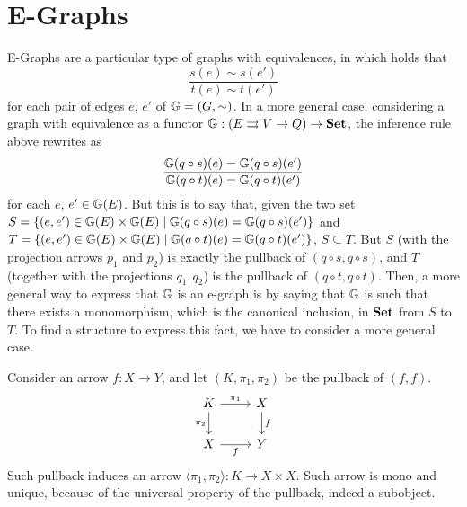 \documentclass[a4paper, twoside,openright]{report}
\theoremstyle{plain}
\theoremstyle{definition}
\begin{document}
\section{E-Graphs}\label{sect:eggs}


E-Graphs are a particular type of graphs with equivalences, in which holds that
$$
    \frac{s(e) \sim s(e')}{t(e) \sim t(e')}
$$
for each pair of edges $e$, $e'$ of $\mathbb{G} = (G, \sim)$.
In a more general case, considering a graph with equivalence as a functor $\mathbb{G} : (E \rightrightarrows V \rightarrow Q) \rightarrow \mathbf{Set}$, the inference rule above rewrites as
\[
    \frac{\mathbb{G}(q \circ s)(e) = \mathbb{G}(q \circ s)(e')}{\mathbb{G}(q \circ t)(e) = \mathbb{G}(q \circ t)(e')}
\] for each $e$, $e' \in \mathbb{G}(E)$.
But this is to say that, given the two set $S = \{ (e, e') \in \mathbb{G}(E) \times \mathbb{G}(E) \mid \mathbb{G}(q \circ s)(e) = \mathbb{G}(q \circ s)(e') \}$ and $T =\{ (e, e') \in \mathbb{G}(E) \times \mathbb{G}(E) \mid \mathbb{G}(q \circ t)(e) = \mathbb{G}(q \circ t)(e') \} $, $S \subseteq T$. But $S$ (with the projection arrows $p_1$ and $p_2$) is exactly the pullback of $(q \circ s, q \circ s)$, and $T$ (together with the projections $q_1, q_2$) is the pullback of $(q \circ t, q \circ t)$. Then, a more general way to express that $\mathbb{G}$ is an e-graph is by saying that $\mathbb{G}$ is such that there exists a monomorphism, which is the canonical inclusion, in $\mathbf{Set}$ from $S$ to $T$.
To find a structure to express this fact, we have to consider a more general case.

Consider an arrow $f: X \rightarrow Y$, and let $(K, \pi_1, \pi_2)$ be the pullback of $(f, f)$.
\[
    \begin{tikzcd}
        K \arrow[r, "{\pi_1}"] \arrow[d, "{\pi_2}"swap] & X \arrow[d, "f"] \\
        X \arrow[r, "f"swap] & Y
    \end{tikzcd}
\]
Such pullback induces an arrow $\langle \pi_1, \pi_2 \rangle : K \rightarrow X\times X$. Such arrow is mono and unique, because of the universal property of the pullback, indeed a subobject.
\end{document}
